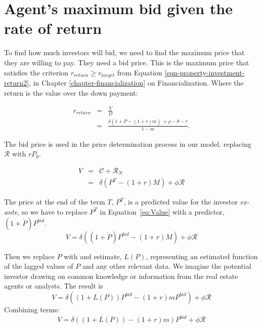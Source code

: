 \section{Agent's maximum bid given the rate of return}

To find how much investors will bid, we need to find the maximum price that they are willing to pay. They need a bid price. This is the maximum price that satisfies the criterion $r_{return} \geq r_{target}$ from Equation \ref{eqn-property-investment-return2}, in Chapter \ref{chapter-financialization} on Financialization. Where the return is the value over the down payment:

\begin{eqnarray*}
 r_{return} 
   &=& \frac{V}{D} \\
   &=& \frac{\delta \left(1+\dot P - (1+r)m\right) \ + \rho - \theta - \tau}{1-m}.
\end{eqnarray*}

The bid price is used in the price determination process in our model. %
replacing $\mathcal{R}$ with $rP_0$. 

\begin{eqnarray*}
V &=& \mathcal{C} + \mathcal{R}_N \nonumber \\
  &=& \delta \left(P^T- (1+r)M\right) +\phi \mathcal{R}
\end{eqnarray*}

%

The  price at the end of the term $T$,  $P^T$, is a predicted value  for the investor \textit{ex-ante}, so we have to replace $P^T$ in Equation~\ref{eq:Value} with a predictor, $(1+\dot P)P^{bid}$. 
\[V= \delta \left((1+\dot P)P^{bid}- (1+r)M\right) +\phi \mathcal{R}\]

Then we replace $\dot P$ with and estimate, $L(P)$, representing an estimated function of the lagged values of $P$ and any  other relevant data. We imagine the potential investor drawing on common  knowledge or information from the real estate agents or analysts.  The result is 
\[V= \delta \left((1+L(P))P^{bid}- (1+r)mP^{bid}\right) +\phi \mathcal{R}\]
Combining terms:
\[V= \delta \left((1+L(P))- (1+r)m \right) P^{bid} +\phi \mathcal{R}\]

